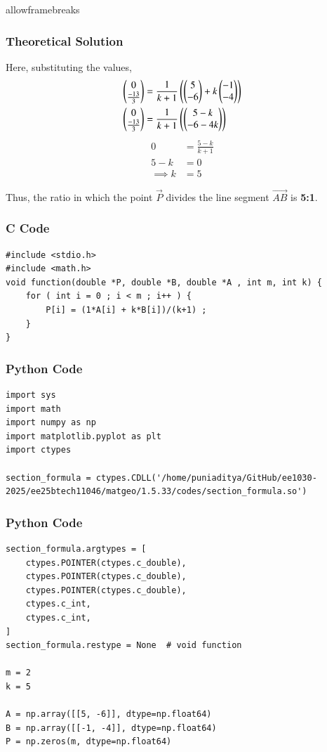 \documentclass{beamer}
\begin{document}
\begin{frame}{allowframebreaks}
\frametitle{Theoretical Solution}
Here, substituting the values,
\begin{align}
    \begin{pmatrix}0 \\ \frac{-13}{3}\end{pmatrix} &= \frac{1}{k+1}\left(\begin{pmatrix}5 \\ -6\end{pmatrix}+k\begin{pmatrix}-1 \\ -4\end{pmatrix}\right) \\
    \begin{pmatrix}0 \\ \frac{-13}{3}\end{pmatrix} &= \frac{1}{k+1}\left(\begin{pmatrix}5-k \\ -6-4k\end{pmatrix}\right) \\
\end{align}
\begin{align}
0 &= \frac{5-k}{k+1} \\
5-k &= 0 \\
\implies k &= 5
\end{align}

Thus, the ratio in which the point $\vec{P}$ divides the line segment $\vec{AB}$ is \textbf{5:1}.
\end{frame}

\begin{frame}[fragile]
    \frametitle{C Code}
    \begin{lstlisting}
#include <stdio.h>
#include <math.h>
void function(double *P, double *B, double *A , int m, int k) {
    for ( int i = 0 ; i < m ; i++ ) {
        P[i] = (1*A[i] + k*B[i])/(k+1) ; 
    }
}
    \end{lstlisting}
\end{frame}

\begin{frame}[fragile]
    \frametitle{Python Code}
    \begin{lstlisting}
import sys
import math
import numpy as np
import matplotlib.pyplot as plt
import ctypes

section_formula = ctypes.CDLL('/home/puniaditya/GitHub/ee1030-2025/ee25btech11046/matgeo/1.5.33/codes/section_formula.so')
    \end{lstlisting}
\end{frame}

\begin{frame}[fragile]
    \frametitle{Python Code}
    \begin{lstlisting}
section_formula.argtypes = [
    ctypes.POINTER(ctypes.c_double),
    ctypes.POINTER(ctypes.c_double),
    ctypes.POINTER(ctypes.c_double),
    ctypes.c_int,
    ctypes.c_int,
]
section_formula.restype = None  # void function

m = 2
k = 5

A = np.array([[5, -6]], dtype=np.float64)
B = np.array([[-1, -4]], dtype=np.float64)
P = np.zeros(m, dtype=np.float64)
    \end{lstlisting}
\end{frame}
\end{document}
